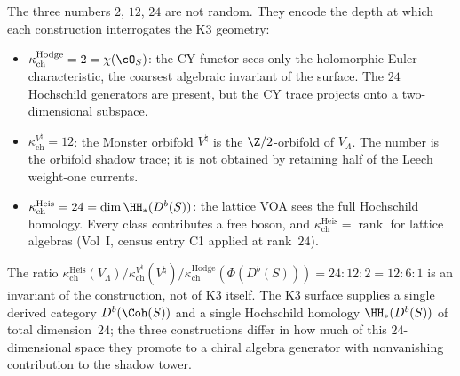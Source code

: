 The three numbers $2$, $12$, $24$ are not random.
They encode the depth at which each construction interrogates the K3 geometry:
\begin{itemize}
\item $\kappa_{\mathrm{ch}}^{\mathrm{Hodge}} = 2 = \chi(\cO_S)$: the CY functor sees only the
 holomorphic Euler characteristic, the coarsest algebraic invariant of the surface.
 The $24$ Hochschild generators are present, but the CY trace projects onto a
 two-dimensional subspace.
\item \(\kappa_{\mathrm{ch}}^{V^\natural} = 12\): the Monster orbifold
 \(V^\natural\) is the \(\Z/2\)-orbifold of \(V_\Lambda\). The number is the
 orbifold shadow trace; it is not obtained by retaining half of the Leech
 weight-one currents.
\item $\kappa_{\mathrm{ch}}^{\mathrm{Heis}} = 24 = \dim \HH_*(D^b(S))$: the lattice VOA sees
 the full Hochschild homology. Every class contributes a free boson, and
 \(\kappa_{\mathrm{ch}}^{\mathrm{Heis}} = \operatorname{rank}\) for lattice algebras
 (Vol~I, census entry C1 applied at rank~$24$).
\end{itemize}
The ratio
\(\kappa_{\mathrm{ch}}^{\mathrm{Heis}}(V_\Lambda) /
\kappa_{\mathrm{ch}}^{V^\natural}(V^\natural) /
\kappa_{\mathrm{ch}}^{\mathrm{Hodge}}(\Phi(D^b(S))) =
24 : 12 : 2 = 12 : 6 : 1\)
is an invariant of the construction, not of K3 itself. The K3 surface
supplies a single derived category $D^b(\Coh(S))$ and a single Hochschild homology
$\HH_*(D^b(S))$ of total dimension~$24$; the three constructions differ in how much of
this $24$-dimensional space they promote to a chiral algebra generator with
nonvanishing contribution to the shadow tower.

